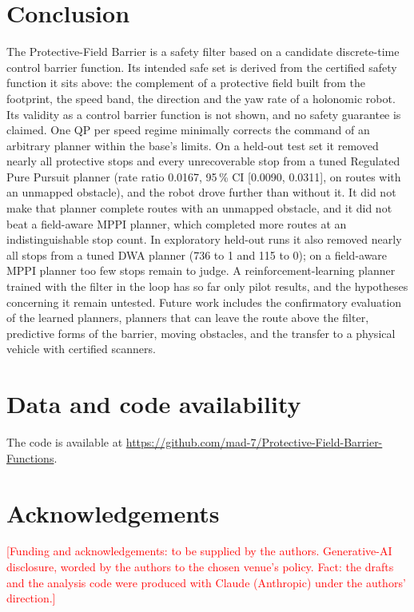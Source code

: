 \documentclass[11pt]{article}
\newcommand{\tbd}[1]{\textcolor{red}{[#1]}}
\theoremstyle{definition}
\begin{document}
\section{Conclusion}\label{sec:conclusion}

The Protective-Field Barrier is a safety filter based on a candidate discrete-time control barrier function. Its
intended safe set is derived from the certified safety function it sits above: the complement of a protective field built
from the footprint, the speed band, the direction and the yaw rate of a holonomic robot. Its validity as a control barrier
function is not shown, and no safety guarantee is claimed. One QP per speed regime minimally corrects the command of an
arbitrary planner within the base's limits. On a held-out test set it removed nearly all protective stops and every
unrecoverable stop from a tuned Regulated Pure Pursuit planner (rate ratio 0.0167, 95\,\% CI [0.0090, 0.0311], on routes
with an unmapped obstacle), and the robot drove further than without it. It did not make that planner complete routes with an
unmapped obstacle, and it did not beat a field-aware MPPI planner, which completed more routes at an indistinguishable stop
count. In exploratory held-out runs it also removed nearly all stops from a tuned DWA planner (736 to 1 and 115 to 0); on a
field-aware MPPI planner too few stops remain to judge. A reinforcement-learning planner trained with the filter in the loop
has so far only pilot results, and the hypotheses concerning it remain untested. Future work includes the confirmatory
evaluation of the learned planners, planners that can leave the route above the filter, predictive forms of the barrier,
moving obstacles, and the transfer to a physical vehicle with certified scanners.

\section*{Data and code availability}
The code is available at \url{https://github.com/mad-7/Protective-Field-Barrier-Functions}.

\section*{Acknowledgements}
\tbd{Funding and acknowledgements: to be supplied by the authors. Generative-AI disclosure, worded by the authors to
the chosen venue's policy. Fact: the drafts and the analysis code were produced with Claude (Anthropic) under the
authors' direction.}
\end{document}
